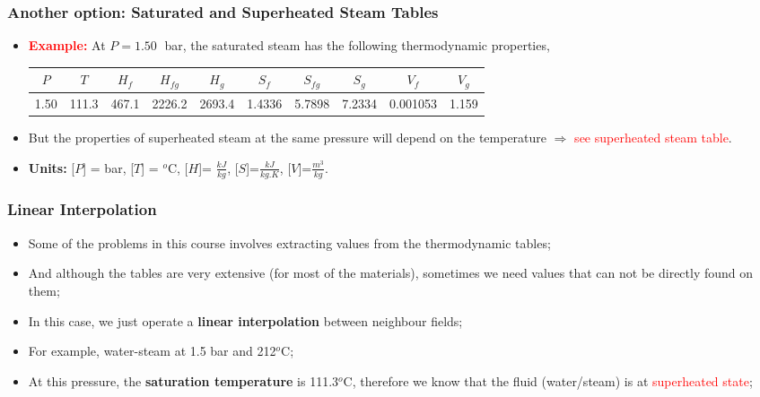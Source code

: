 \documentclass[10pt,compress]{beamer}
\begin{document}
\begin{frame}
  \frametitle{Another option: Saturated and Superheated Steam Tables}
\noindent
\begin{itemize}
\item <2-> {\bf \textcolor{red}{Example:}} At $P=1.50\;$ bar, the saturated steam has the following thermodynamic properties,
\tiny
\begin{center}
\begin{tabular}{||c|c|c c c|c c c|c c||} 
\hline\hline
$P$ & $T$ & $H_{f}$ &  $H_{fg}$ & $H_{g}$ & $S_{f}$ &  $S_{fg}$ &  $S_{g}$ & $V_{f}$ & $V_{g}$ \\ 
\hline
1.50 & 111.3 & 467.1 & 2226.2 & 2693.4 & 1.4336 & 5.7898 & 7.2334 & 0.001053 & 1.159 \\
\hline
\end{tabular}
\end{center}

\item <3-> But the properties of superheated steam at the same pressure will depend on the temperature $\Rightarrow$ \textcolor{red}{see superheated steam table}.

\item <2-> {\bf Units:} [$P$] = bar, [$T$] = $^{o}$C, [$H$]= $\frac{kJ}{kg}$, [$S$]=$\frac{kJ}{kg.K}$, [$V$]=$\frac{m^{3}}{kg}$.

\end{itemize}

\end{frame}


\begin{frame}
  \frametitle{Linear Interpolation}
\noindent
\begin{itemize}
\item <2-> Some of the problems in this course involves extracting values from the thermodynamic tables;
\item <3-> And although the tables are very extensive (for most of the materials), sometimes we need values that can not be directly found on them;
\item <4-> In this case, we just operate a {\bf linear interpolation} between neighbour fields;
\item <5-> For example, water-steam at 1.5 bar and 212$^{o}$C;
\item <6-> At this pressure, the {\bf saturation temperature} is 111.3$^{o}$C, therefore we know that the fluid (water/steam) is at \textcolor{red}{superheated state};
\end{itemize}

\end{frame}
\end{document}
